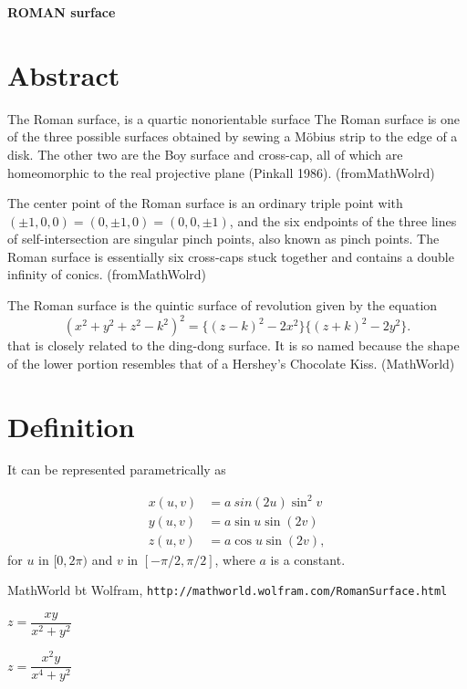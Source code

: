 \documentclass[12pt,dvipdfmx]{article}
\begin{document}
\begin{center}

{\bf \Large ROMAN surface}

\end{center}


\section{Abstract}

The Roman surface, is a quartic nonorientable surface The Roman surface is one of the three possible surfaces obtained by sewing a Möbius strip to the edge of a disk. The other two are the Boy surface and cross-cap, all of which are homeomorphic to the real projective plane (Pinkall 1986). (fromMathWolrd)

The center point of the Roman surface is an ordinary triple point with $(\pm1,0,0)=(0, \pm 1,0)=(0,0, \pm 1)$, and the six endpoints of the three lines of self-intersection are singular pinch points, also known as pinch points. The Roman surface is essentially six cross-caps stuck together and contains a double infinity of conics. (fromMathWolrd)


The Roman surface is the quintic surface of revolution given by the equation
\[
 (x^2+y^2+z^2-k^2)^2=\{(z-k)^2-2x^2\}\{(z+k)^2-2y^2\}.  	
\]
that is closely related to the ding-dong surface. It is so named because the shape of the lower portion resembles that of a Hershey's Chocolate Kiss. (MathWorld)

\section{Definition}

It can be represented parametrically as

\begin{align*}
x(u,v)	&=	a\ sin(2u) \sin^2v	\\ 
y(u,v)	&=	a\sin u \sin(2v)	\\
z(u,v)	&=	a\cos u \sin(2v),
\end{align*}
for $u$ in $[0,2\pi)$ and $v$ in $[-\pi/2,\pi/2]$, where $a$ is a constant.


\begin{thebibliography}{9}

 MathWorld bt Wolfram, \verb|http://mathworld.wolfram.com/RomanSurface.html|


\end{thebibliography}

\newpage

{\Huge $z=\dfrac{xy}{x^2+y^2}$}

\bigskip 

\vspace{3cm}



{\Huge $z=\dfrac{x^2y}{x^4+y^2}$}
\end{document}
